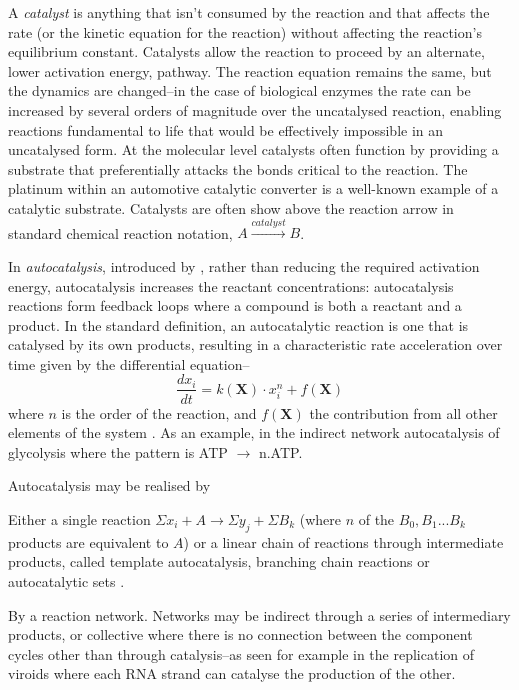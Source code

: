 A \emph{catalyst} is anything that isn't consumed by the reaction and that affects the rate (or the kinetic equation for the reaction) without
affecting the reaction's equilibrium constant. Catalysts allow the reaction to proceed by an alternate, lower activation energy, pathway.
The reaction equation remains the same, but the dynamics are changed--in the case of biological enzymes the rate can be increased by several
orders of magnitude over the uncatalysed reaction, enabling reactions fundamental to life that would be effectively impossible in an
uncatalysed form. At the molecular level catalysts often function by providing a substrate that preferentially attacks the bonds critical to
the reaction. The platinum within an automotive catalytic converter is a well-known example of a catalytic substrate. Catalysts are often show above the reaction arrow in standard chemical reaction notation, \eg$A\xrightarrow{catalyst} B$.

In \emph{autocatalysis}, introduced by \textcite{Ostwald1890}, rather than reducing the required activation
energy, autocatalysis increases the reactant concentrations: autocatalysis reactions form feedback loops where a compound is both a
reactant and a product. In the standard definition, an autocatalytic reaction is one that is catalysed by its own products, resulting in a
characteristic rate acceleration over time given by the differential equation--
\[\frac{dx_i}{dt} = k(\mathbf{X}) \cdot x^n_i + f(\mathbf{X})\] where $n$ is the order of the reaction, and $f(\mathbf{X})$ the contribution from all other elements of the system \parencite{Plasson2010}. As an example, in the indirect network autocatalysis of glycolysis where the pattern is ATP \(\rightarrow\) n.ATP.

Autocatalysis may be realised by \begin{inparaenum}
	\item Either a single reaction \eg$\Sigma x_i + A\rightarrow \Sigma y_j + \Sigma B_k$ (where $n$ of the ${B_0, B_1...B_k}$ products are equivalent to $A$) or a linear chain of reactions through intermediate products, called template autocatalysis, branching chain reactions or autocatalytic sets \parencite{King1978}.
	\item By a reaction network. Networks may be indirect through a series of intermediary products, or collective where there is no connection between the component cycles other than through catalysis--as seen for example in the replication of viroids where each RNA strand can catalyse the production of the other.
\end{inparaenum}

